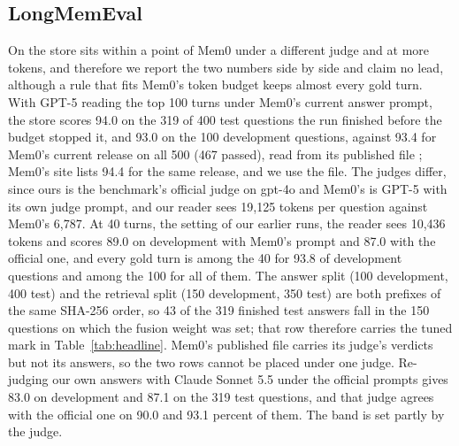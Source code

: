\subsection{LongMemEval}
\label{sec:lme}

On \lmes{} the store sits within a point of Mem0 under a different judge and at more tokens, and therefore we report the two numbers side by side and claim no lead, although a rule that fits Mem0's token budget keeps almost every gold turn. With GPT-5 reading the top 100 turns under Mem0's current answer prompt, the store scores 94.0 on the 319 of 400 test questions the run finished before the budget stopped it, and 93.0 on the 100 development questions, against 93.4 for Mem0's current release on all 500 (467 passed), read from its published file \citep{mem0benchmarks2026}; Mem0's site lists 94.4 for the same release, and we use the file. The judges differ, since ours is the benchmark's official judge on gpt-4o and Mem0's is GPT-5 with its own judge prompt, and our reader sees 19,125 tokens per question against Mem0's 6,787. At 40 turns, the setting of our earlier runs, the reader sees 10,436 tokens and scores 89.0 on development with Mem0's prompt and 87.0 with the official one, and every gold turn is among the 40 for 93.8 of development questions and among the 100 for all of them. The answer split (100 development, 400 test) and the retrieval split (150 development, 350 test) are both prefixes of the same SHA-256 order, so 43 of the 319 finished test answers fall in the 150 questions on which the fusion weight was set; that row therefore carries the tuned mark in Table~\ref{tab:headline}. Mem0's published file carries its judge's verdicts but not its answers, so the two rows cannot be placed under one judge. Re-judging our own answers with Claude Sonnet 5.5 under the official prompts gives 83.0 on development and 87.1 on the 319 test questions, and that judge agrees with the official one on 90.0 and 93.1 percent of them. The band is set partly by the judge.

